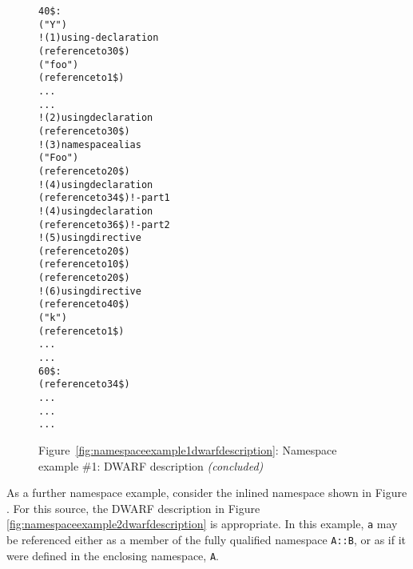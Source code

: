 \begin{figure}
\begin{dwflisting}
\begin{alltt}
40\$:  \DWTAGnamespace
          \DWATname("Y")
          \DWTAGimporteddeclaration            ! (1) using-declaration
              \DWATimport(reference to 30\$)
          \DWTAGvariable
              \DWATname("foo")
              \DWATtype(reference to 1\$)
              \DWATlocation ...
              ...
      \DWTAGimporteddeclaration                ! (2) using declaration
          \DWATimport(reference to 30\$)
      \DWTAGimporteddeclaration                ! (3) namespace alias
          \DWATname("Foo")
          \DWATimport(reference to 20\$)
      \DWTAGimporteddeclaration                ! (4) using declaration
          \DWATimport(reference to 34\$)         !     - part 1
      \DWTAGimporteddeclaration                ! (4) using declaration
          \DWATimport(reference to 36\$)         !     - part 2
      \DWTAGimportedmodule                     ! (5) using directive
          \DWATimport(reference to 20\$)
      \DWTAGnamespace
          \DWATextension(reference to 10\$)
          \DWTAGnamespace
              \DWATextension(reference to 20\$)
              \DWTAGimportedmodule             ! (6) using directive
                  \DWATimport(reference to 40\$)
              \DWTAGvariable
                  \DWATname("k")
                  \DWATtype(reference to 1\$)
                  \DWATlocation ...
                  ...
60\$:  \DWTAGsubprogram
          \DWATspecification(reference to 34\$)
          \DWATlowpc ...
          \DWAThighpc ...
          ...
\end{alltt}
\end{dwflisting}
\begin{center}
\vspace{3mm}
Figure~\ref{fig:namespaceexample1dwarfdescription}: Namespace example \#1: DWARF description \textit{(concluded)}
\end{center}
\end{figure}

\clearpage
As a further namespace example, consider the inlined namespace shown in
Figure . For this source,
the DWARF description in Figure \ref{fig:namespaceexample2dwarfdescription}
is appropriate. In this example, \texttt{a} may be referenced either as a member of 
the fully qualified namespace \texttt{A::B}, or as if it were defined
in the enclosing namespace, \texttt{A}.

